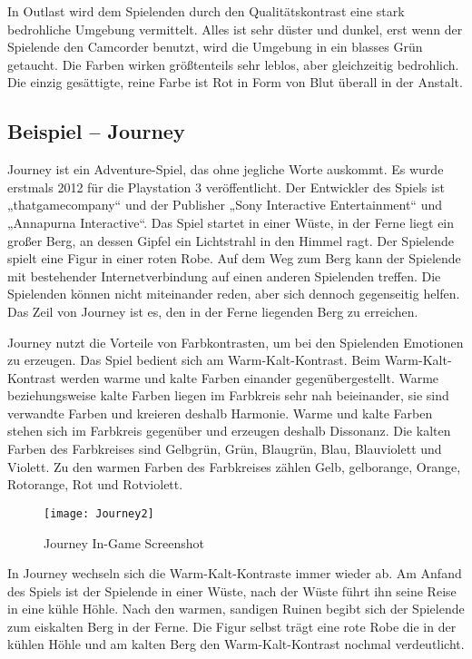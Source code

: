In Outlast wird dem Spielenden durch den Qualitätskontrast eine stark bedrohliche Umgebung vermittelt. Alles ist sehr düster und dunkel, erst wenn der Spielende den Camcorder benutzt, wird die Umgebung in ein blasses Grün getaucht. Die Farben wirken größtenteils sehr leblos, aber gleichzeitig bedrohlich. Die einzig gesättigte, reine Farbe ist Rot in Form von Blut überall in der Anstalt. 
\cite{_outlast}
\cite{_farbkontraste}

\subsection{Beispiel – Journey}
Journey ist ein Adventure-Spiel, das ohne jegliche Worte auskommt. Es wurde erstmals 2012 für die Playstation 3 veröffentlicht. Der Entwickler des Spiels ist „thatgamecompany“ und der Publisher „Sony Interactive Entertainment“ und „Annapurna Interactive“. Das Spiel startet in einer Wüste, in der Ferne liegt ein großer Berg, an dessen Gipfel ein Lichtstrahl in den Himmel ragt. Der Spielende spielt eine Figur in einer roten Robe. Auf dem Weg zum Berg kann der Spielende mit bestehender Internetverbindung auf einen anderen Spielenden treffen. Die Spielenden können nicht miteinander reden, aber sich dennoch gegenseitig helfen. Das Zeil von Journey ist es, den in der Ferne liegenden Berg zu erreichen.
\cite{_drawing_basics_and_video_game_art}

Journey nutzt die Vorteile von Farbkontrasten, um bei den Spielenden Emotionen zu erzeugen. Das Spiel bedient sich am Warm-Kalt-Kontrast. Beim Warm-Kalt-Kontrast werden warme und kalte Farben einander gegenübergestellt. Warme beziehungsweise kalte Farben liegen im Farbkreis sehr nah beieinander, sie sind verwandte Farben und kreieren deshalb Harmonie. Warme und kalte Farben stehen sich im Farbkreis gegenüber und erzeugen deshalb Dissonanz. Die kalten Farben des Farbkreises sind Gelbgrün, Grün, Blaugrün, Blau, Blauviolett und Violett. Zu den warmen Farben des Farbkreises zählen Gelb, gelborange, Orange, Rotorange, Rot und Rotviolett.

\cite{_drawing_basics_and_video_game_art}

\begin{figure}[H]
	\centering
	\texttt{[image: Journey2]}
	\caption{Journey In-Game Screenshot\cite{_drawing_basics_and_video_game_art}}
\end{figure}

In Journey wechseln sich die Warm-Kalt-Kontraste immer wieder ab. Am Anfand des Spiels ist der Spielende in einer Wüste, nach der Wüste führt ihn seine Reise in eine kühle Höhle. Nach den warmen, sandigen Ruinen begibt sich der Spielende zum eiskalten Berg in der Ferne. Die Figur selbst trägt eine rote Robe die in der kühlen Höhle und am kalten Berg den Warm-Kalt-Kontrast nochmal verdeutlicht. 
\cite{_drawing_basics_and_video_game_art}


